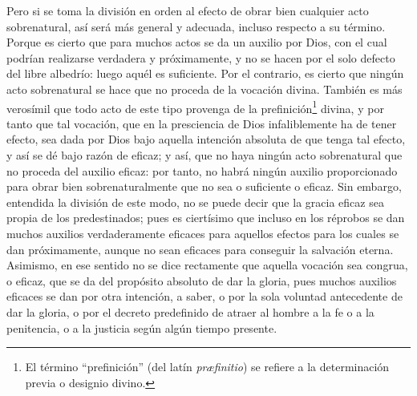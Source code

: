 \documentclass{article}
\begin{document}
Pero si se toma la división en orden al efecto de obrar bien cualquier acto
sobrenatural, así será más general y adecuada, incluso respecto a su término. Porque es
cierto que para muchos actos se da un auxilio por Dios, con el cual podrían realizarse
verdadera y próximamente, y no se hacen por el solo defecto del libre albedrío: luego
aquél es suficiente. Por el contrario, es cierto que ningún acto sobrenatural se hace
que no proceda de la vocación divina. También es más verosímil que todo acto de este
tipo provenga de la prefinición\footnote{El término \enquote{prefinición} (del latín
\textit{præfinitio}) se refiere a la determinación previa o designio divino.} divina, y
por tanto que tal vocación, que en la presciencia de Dios infaliblemente ha de tener
efecto, sea dada por Dios bajo aquella intención absoluta de que tenga tal efecto, y así
se dé bajo razón de eficaz; y así, que no haya ningún acto sobrenatural que no proceda
del auxilio eficaz: por tanto, no habrá ningún auxilio proporcionado para obrar bien
sobrenaturalmente que no sea o suficiente o eficaz. Sin embargo, entendida la división
de este modo, no se puede decir que la gracia eficaz sea propia de los predestinados;
pues es ciertísimo que incluso en los réprobos se dan muchos auxilios verdaderamente
eficaces para aquellos efectos para los cuales se dan próximamente, aunque no sean
eficaces para conseguir la salvación eterna. Asimismo, en ese sentido no se dice
rectamente que aquella vocación sea congrua, o eficaz, que se da del propósito absoluto
de dar la gloria, pues muchos auxilios eficaces se dan por otra intención, a saber, o
por la sola voluntad antecedente de dar la gloria, o por el decreto predefinido de
atraer al hombre a la fe o a la penitencia, o a la justicia según algún tiempo presente.
\end{document}

